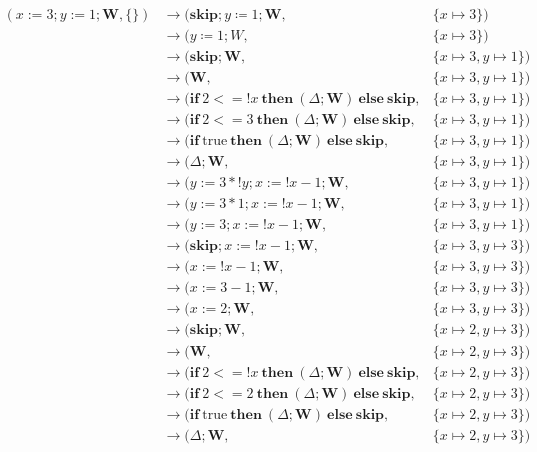 \[
\begin{aligned}
(x := 3; y := 1; \mathbf{W}, \{\}) &\to (\mathbf{skip}; y \coloneqq 1; \mathbf{W}, &\{x \mapsto 3\}) \\
&\to (y \coloneqq 1; W, &\{x \mapsto 3\}) \\
&\to (\mathbf{skip}; \mathbf{W}, &\{x \mapsto 3, y \mapsto 1\}) \\
&\to (\mathbf{W}, &\{x \mapsto 3, y \mapsto 1\}) \\
&\to (\mathbf{if}\ 2 < = !x\ \mathbf{then}\ (\Delta; \mathbf{W})\ \mathbf{else}\ \mathbf{skip}, &\{x \mapsto 3, y \mapsto 1\}) \\
&\to (\mathbf{if}\ 2 < = 3\ \mathbf{then}\ (\Delta; \mathbf{W})\ \mathbf{else}\ \mathbf{skip}, &\{x \mapsto 3, y \mapsto 1\}) \\
&\to (\mathbf{if}\ \text{true}\ \mathbf{then}\ (\Delta; \mathbf{W})\ \mathbf{else}\ \mathbf{skip}, &\{x \mapsto 3, y \mapsto 1\}) \\
&\to (\Delta; \mathbf{W}, &\{x \mapsto 3, y \mapsto 1\}) \\
&\to (y := 3 * !y; x := !x - 1; \mathbf{W}, &\{x \mapsto 3, y \mapsto 1\}) \\
&\to (y := 3 * 1; x := !x - 1; \mathbf{W}, &\{x \mapsto 3, y \mapsto 1\}) \\
&\to (y := 3; x := !x - 1; \mathbf{W}, &\{x \mapsto 3, y \mapsto 1\}) \\
&\to (\mathbf{skip}; x := !x - 1; \mathbf{W}, &\{x \mapsto 3, y \mapsto 3\}) \\
&\to (x := !x - 1; \mathbf{W}, &\{x \mapsto 3, y \mapsto 3\}) \\
&\to (x := 3 - 1; \mathbf{W}, &\{x \mapsto 3, y \mapsto 3\}) \\
&\to (x := 2; \mathbf{W}, &\{x \mapsto 3, y \mapsto 3\}) \\
&\to (\mathbf{skip}; \mathbf{W}, &\{x \mapsto 2, y \mapsto 3\}) \\
&\to (\mathbf{W}, &\{x \mapsto 2, y \mapsto 3\}) \\
&\to (\mathbf{if}\ 2 < = !x\ \mathbf{then}\ (\Delta; \mathbf{W})\ \mathbf{else}\ \mathbf{skip}, &\{x \mapsto 2, y \mapsto 3\}) \\
&\to (\mathbf{if}\ 2 < = 2\ \mathbf{then}\ (\Delta; \mathbf{W})\ \mathbf{else}\ \mathbf{skip}, &\{x \mapsto 2, y \mapsto 3\}) \\
&\to (\mathbf{if}\ \text{true}\ \mathbf{then}\ (\Delta; \mathbf{W})\ \mathbf{else}\ \mathbf{skip}, &\{x \mapsto 2, y \mapsto 3\}) \\
&\to (\Delta; \mathbf{W}, &\{x \mapsto 2, y \mapsto 3\}) \\

\end{aligned}\]
